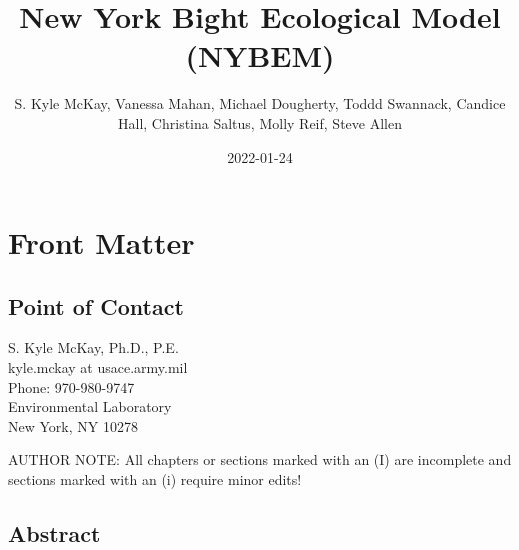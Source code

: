 \documentclass[
]{book}
\title{New York Bight Ecological Model (NYBEM)}
\author{S. Kyle McKay, Vanessa Mahan, Michael Dougherty, Toddd Swannack, Candice Hall, Christina Saltus, Molly Reif, Steve Allen}
\date{2022-01-24}
\begin{document}
\maketitle

{
\setcounter{tocdepth}{1}
\tableofcontents
}
\hypertarget{front-matter}{%
\chapter*{Front Matter}\label{front-matter}}

\hypertarget{point-of-contact}{%
\section*{Point of Contact}\label{point-of-contact}}

S. Kyle McKay, Ph.D., P.E.\\
kyle.mckay at usace.army.mil\\
Phone: 970-980-9747\\
Environmental Laboratory\\
New York, NY 10278

{AUTHOR NOTE: All chapters or sections marked with an (I) are incomplete and sections marked with an (i) require minor edits!}

\hypertarget{abstract}{%
\section*{Abstract}\label{abstract}}
\end{document}
